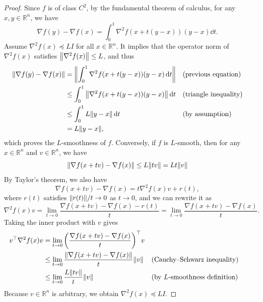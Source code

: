 \documentclass[0_en]{subfiles}
\begin{document}
\begin{proof}
    Since $f$ is of class $C^2$, by the fundamental theorem of calculus, for any $x,y \in \mathbb{R}^n$, we have
    \begin{equation}\label{eq:fundamental-theorem-calculus}
        \nabla f(y) - \nabla f(x)
        = \int_0^1 \nabla^2 f(x+t(y-x))(y-x) \dd{t}.
    \end{equation}
    Assume $\nabla^2 f(x)\preceq L I$ for all $x \in \mathbb{R}^n$.
    It implies that the operator norm of $\nabla^2 f(x)$ satisfies $\norm{\nabla^2 f(x)} \le L$, and thus
    \begin{align*}
        \norm{\nabla f(y) - \nabla f(x)}
         & = \norm{\int_0^1 \nabla^2 f(x+t(y-x))(y-x) \dd{t}}   &  & (\text{previous equation})   \\
         & \le \int_0^1 \norm{\nabla^2 f(x+t(y-x))(y-x)} \dd{t} &  & (\text{triangle inequality}) \\
         & \le \int_0^1 L\norm{y-x} \dd{t}                      &  & (\text{by assumption})       \\
         & = L\norm{y-x},
    \end{align*}
    which proves the $L$-smoothness of $f$.
    Conversely, if $f$ is $L$-smooth, then for any $x \in \mathbb{R}^n$ and $v \in \mathbb{R}^n$, we have
    \begin{equation}\label{eq:smoothness-bound}
        \norm{\nabla f(x+tv)-\nabla f(x)} \le L\norm{tv} = Lt\norm{v}
    \end{equation}
    By Taylor's theorem, we also have
    \begin{equation*}
        \nabla f(x+tv)-\nabla f(x) = t \nabla^2 f(x) v + r(t),
    \end{equation*}
    where $r(t)$ satisfies $\norm{r(t)}/t \to 0$ as $t \to 0$, and we can rewrite it as
    \begin{equation}
        \nabla^2 f(x) v = \lim_{t \to 0} \frac{\nabla f(x+tv)-\nabla f(x) -r(t)}{t} = \lim_{t \to 0} \frac{\nabla f(x+tv)-\nabla f(x)}{t}.
    \end{equation}
    Taking the inner product  with $v$ gives
    \begin{align*}
        v^\top \nabla^2 f(x) v & = \lim_{t \to 0} \qty(\frac{\nabla f(x+tv)-\nabla f(x)}{t})^\top v                                                  \\
                               & \leq \lim_{t \to 0} \frac{\norm{\nabla f(x+tv)-\nabla f(x)}}{t} \norm{v} &  & (\text{Cauchy--Schwarz inequality})   \\
                               & \leq \lim_{t \to 0} \frac{L\norm{tv}}{t} \norm{v}                        &  & (\text{by $L$-smoothness definition}) \\
    \end{align*}
    Because $v \in \mathbb{R}^n$ is arbitrary, we obtain $\nabla^2 f(x)\preceq L I$.
\end{proof}
\end{document}

